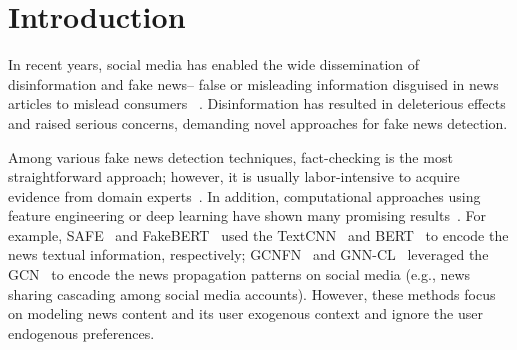 \documentclass[sigconf]{acmart}
\begin{document}






\maketitle


\section{Introduction}
\label{sec01:intro}



In recent years, social media has enabled the wide dissemination of disinformation and fake news-- false or misleading information disguised in news articles to mislead consumers~
\cite{zhou2020survey, shu2017fake}.
Disinformation has resulted in deleterious effects and raised serious concerns, demanding novel approaches for fake news detection.



Among various fake news detection techniques, fact-checking is the most straightforward approach; however, it is usually labor-intensive to acquire evidence from domain experts~\cite{hassan2017claimbuster}.
In addition, computational approaches using feature engineering or deep learning have shown many promising results~\cite{wang2018eann, karimi2018multi, ruchansky2017csi, chandra2020graph}.
For example, SAFE~\cite{zhou2020mathsf} and FakeBERT~\cite{kaliyarfakebert} used the TextCNN~\cite{zhang2015sensitivity} and BERT~\cite{devlin2018bert,sun2020mixup,sun2020adv} to encode the news textual information, respectively; GCNFN~\cite{monti2019fake} and GNN-CL~\cite{han2020graph} leveraged the GCN~\cite{kipf2016semi} to encode the news propagation patterns on social media (e.g., news sharing cascading among social media accounts).
However, these methods focus on modeling news content and its user exogenous context and ignore the user endogenous preferences. 
\end{document}
